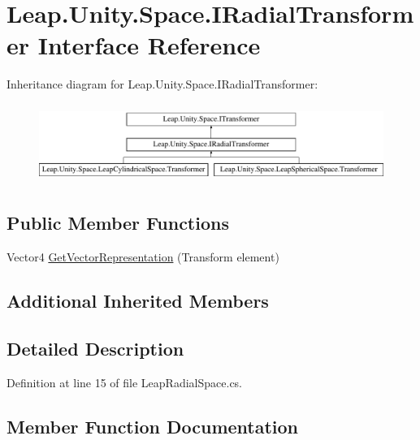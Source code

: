 \hypertarget{interface_leap_1_1_unity_1_1_space_1_1_i_radial_transformer}{}\section{Leap.\+Unity.\+Space.\+I\+Radial\+Transformer Interface Reference}
\label{interface_leap_1_1_unity_1_1_space_1_1_i_radial_transformer}
Inheritance diagram for Leap.\+Unity.\+Space.\+I\+Radial\+Transformer\+:\begin{figure}[H]
\begin{center}
\leavevmode
\includegraphics[height=2.608696cm]{interface_leap_1_1_unity_1_1_space_1_1_i_radial_transformer}
\end{center}
\end{figure}
\subsection*{Public Member Functions}
\begin{DoxyCompactItemize}
\item 
Vector4 \mbox{\hyperlink{interface_leap_1_1_unity_1_1_space_1_1_i_radial_transformer_af08c4933956ae199215c193458086c66}{Get\+Vector\+Representation}} (Transform element)
\end{DoxyCompactItemize}
\subsection*{Additional Inherited Members}


\subsection{Detailed Description}


Definition at line 15 of file Leap\+Radial\+Space.\+cs.



\subsection{Member Function Documentation}
\mbox{\label{interface_leap_1_1_unity_1_1_space_1_1_i_radial_transformer_af08c4933956ae199215c193458086c66}} 
